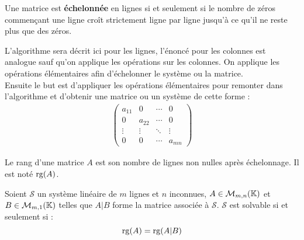 \begin{definition}
	Une matrice est \textbf{échelonnée} en lignes si et seulement si le nombre de zéros commençant une ligne croît strictement ligne par ligne jusqu'à ce qu'il ne reste plus que des zéros.
\end{definition}

L'algorithme sera décrit ici pour les lignes, l'énoncé pour les colonnes est analogue sauf qu'on applique les opérations sur les colonnes.
   	On applique les opérations élémentaires afin d'échelonner le système ou la matrice.
    \\
    Ensuite le but est d'appliquer les opérations élémentaires pour \og remonter \fg dans l'algorithme et d'obtenir une matrice ou un système de cette forme :
    \begin{align*}
        \begin{pmatrix}
            a_{11} & 0 & \cdots & 0 \\
            0 & a_{22} & \cdots & 0 \\ 
            \vdots & \vdots & \ddots & \vdots \\ 
            0 & 0 & \cdots & a_{mn}
        \end{pmatrix}
    \end{align*}

\begin{definition}
	Le rang d'une matrice $A$ est son nombre de lignes non nulles après échelonnage. Il est noté $\operatorname{rg}(A)$.
\end{definition}

\begin{theorem}
    Soient $\mathcal{S}$ un système linéaire de $m$ lignes et $n$ inconnues, $A \in \mathcal{M}_{m,n}(\mathbb{K})$ et $B \in \mathcal{M}_{m,1}(\mathbb{K})$ telles que $A|B$ forme la matrice associée à $\mathcal{S}$. $\mathcal{S}$ est solvable si et seulement si :
    \[ \operatorname{rg}(A) = \operatorname{rg}(A|B) \]
\end{theorem}

